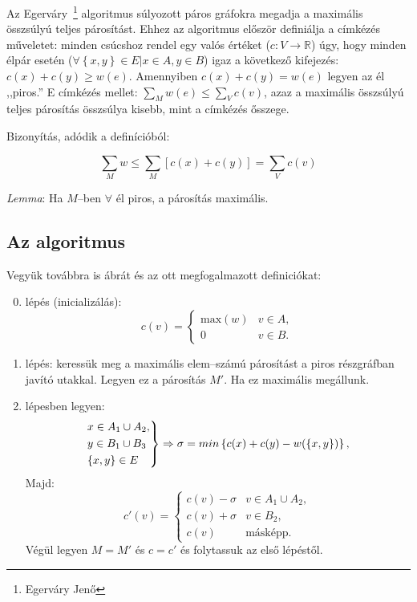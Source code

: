 Az Egerváry~\footnote{Egerváry Jenő} algoritmus súlyozott páros gráfokra megadja
a maximális összsúlyú teljes párosítást. Ehhez az algoritmus először definiálja
a címkézés műveletet: minden csúcshoz rendel egy valós értéket ($c:V \rightarrow
	\mathbb{R}$) úgy, hogy minden élpár esetén ($\forall \left\{x,y\right\} \in E |
	x \in A, y \in B$) igaz a következő kifejezés: $c(x)+c(y) \geq w(e)$. Amennyiben
$c(x)+c(y)=w(e)$ legyen az él ,,piros.'' E címkézés mellet: $\sum_{M}w(e) \leq
	\sum_{V}c(v)$, azaz a maximális összsúlyú teljes párosítás összsúlya kisebb, mint
a címkézés ősszege.

Bizonyítás, adódik a definícióból:

\begin{displaymath}
	\sum_M{w} \leq \sum_M{\left[c(x)+c(y)\right]} = \sum_V{c(v)}
\end{displaymath}

\emph{Lemma}: Ha $M$--ben $\forall$ él piros, a párosítás maximális.

\subsection{Az algoritmus}

Vegyük továbbra is  ábrát és az ott megfogalmazott definiciókat:

\begin{enumerate}
	\setcounter{enumi}{-1}
	\item lépés (inicializálás):   \begin{displaymath}
		      c(v)=\begin{cases}
			      \mbox{max}(w) & v \in A, \\
			      0             & v \in B.
		      \end{cases}
	      \end{displaymath}
	\item lépés: keressük meg a maximális elem--számú párosítást a piros részgráfban
	      javító utakkal.
	      Legyen ez a párosítás $M'$. Ha ez maximális megállunk.
	\item lépesben legyen:
	      \begin{displaymath}
		      \begin{rcases}
			      x \in A_1 \cup A_2, \\
			      y \in B_1 \cup B_3  \\
			      \{x,y\} \in E
		      \end{rcases}
		      \Rightarrow \sigma= min\left\{c(x) + c(y) - w(\left\{x,y\right\}) \right\},
	      \end{displaymath}
	      Majd: \begin{displaymath}
		      c'(v)=\begin{cases}
			      c(v)-\sigma & v \in A_1 \cup A_2, \\
			      c(v)+\sigma & v \in B_2,          \\
			      c(v)        & \mbox{másképp.}
		      \end{cases}
	      \end{displaymath}
	      Végül legyen $M=M'$ és $c=c'$ és folytassuk az első lépéstől.
\end{enumerate}


